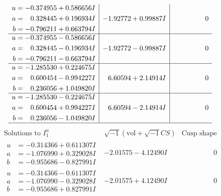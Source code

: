 \documentclass[1p]{elsarticle_modified}
\theoremstyle{definition}
\newcommand{\I}{\sqrt{-1}}
\begin{document}
$$\begin{array}{c|c|c}
\begin{aligned}
u &= -0.374955 + 0.586656 I \\
a &= \phantom{-}0.328445 + 0.196934 I \\
b &= -0.796211 + 0.663794 I\end{aligned}
 & -1.92772 + 0.99887 I & \phantom{-0.000000 } 0 \\ \hline\begin{aligned}
u &= -0.374955 - 0.586656 I \\
a &= \phantom{-}0.328445 - 0.196934 I \\
b &= -0.796211 - 0.663794 I\end{aligned}
 & -1.92772 - 0.99887 I & \phantom{-0.000000 } 0 \\ \hline\begin{aligned}
u &= -1.285530 + 0.224675 I \\
a &= \phantom{-}0.600454 - 0.994227 I \\
b &= \phantom{-}0.236056 + 1.049820 I\end{aligned}
 & \phantom{-}6.60594 + 2.14914 I & \phantom{-0.000000 } 0 \\ \hline\begin{aligned}
u &= -1.285530 - 0.224675 I \\
a &= \phantom{-}0.600454 + 0.994227 I \\
b &= \phantom{-}0.236056 - 1.049820 I\end{aligned}
 & \phantom{-}6.60594 - 2.14914 I & \phantom{-0.000000 } 0\\
 \hline 
 \end{array}$$\newpage$$\begin{array}{c|c|c}  
\text{Solutions to }I^u_{1}& \I (\text{vol} + \sqrt{-1}CS) & \text{Cusp shape}\\
 \hline 
\begin{aligned}
u &= -0.314366 + 0.611307 I \\
a &= -1.076990 + 0.329028 I \\
b &= -0.955686 - 0.827991 I\end{aligned}
 & -2.01575 - 4.12490 I & \phantom{-0.000000 } 0 \\ \hline\begin{aligned}
u &= -0.314366 - 0.611307 I \\
a &= -1.076990 - 0.329028 I \\
b &= -0.955686 + 0.827991 I\end{aligned}
 & -2.01575 + 4.12490 I & \phantom{-0.000000 } 0 \\ \hline\begin{aligned}

\end{aligned}
\end{array}$$
\end{document}
